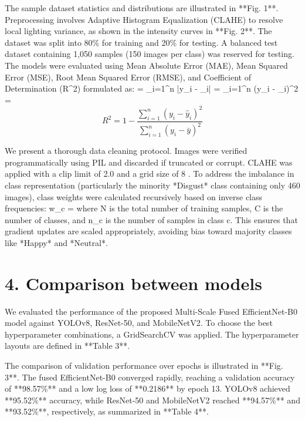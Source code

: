 \documentclass[journal,10pt]{IEEEtran}
\begin{document}
The sample dataset statistics and distributions are illustrated in **Fig. 1**. Preprocessing involves Adaptive Histogram Equalization (CLAHE) to resolve local lighting variance, as shown in the intensity curves in **Fig. 2**. The dataset was split into 80\% for training and 20\% for testing. A balanced test dataset containing 1,050 samples (150 images per class) was reserved for testing. The models were evaluated using Mean Absolute Error (MAE), Mean Squared Error (MSE), Root Mean Squared Error (RMSE), and Coefficient of Determination (R^2) formulated as:
 =  \sum\_{i=1}^n |y\_i - \_i|
 =  \sum\_{i=1}^n (y\_i - \_i)^2
 = 
\begin{equation}
R^2 = 1 - \frac{\sum_{i=1}^n (y_i - \hat{y}_i)^2}{\sum_{i=1}^n (y_i - \bar{y})^2}
\end{equation}

We present a thorough data cleaning protocol. Images were verified programmatically using PIL and discarded if truncated or corrupt. CLAHE was applied with a clip limit of 2.0 and a grid size of 8 . To address the imbalance in class representation (particularly the minority *Disgust* class containing only 460 images), class weights were calculated recursively based on inverse class frequencies:
w\_c = 
where N is the total number of training samples, C is the number of classes, and n\_c is the number of samples in class c. This ensures that gradient updates are scaled appropriately, avoiding bias toward majority classes like *Happy* and *Neutral*.

\section{4. Comparison between models}
We evaluated the performance of the proposed Multi-Scale Fused EfficientNet-B0 model against YOLOv8, ResNet-50, and MobileNetV2. To choose the best hyperparameter combinations, a GridSearchCV was applied. The hyperparameter layouts are defined in **Table 3**.

The comparison of validation performance over epochs is illustrated in **Fig. 3**. The fused EfficientNet-B0 converged rapidly, reaching a validation accuracy of **98.57\%** and a low log loss of **0.2186** by epoch 13. YOLOv8 achieved **95.52\%** accuracy, while ResNet-50 and MobileNetV2 reached **94.57\%** and **93.52\%**, respectively, as summarized in **Table 4**. 
\end{document}
